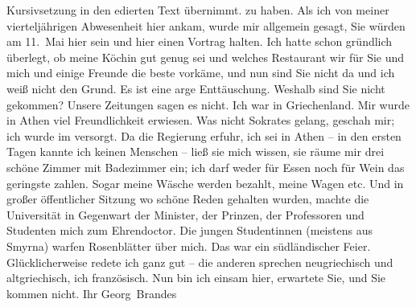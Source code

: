 \begin{ledgroupsized}[t]{13cm}
{{{{                  Kursivsetzung in den edierten Text übernimmt.}}}\label{K_L02383_1h}} zu haben.\pend
           \pstart
           Als ich von meiner vierteljährigen Abwesenheit hier ankam, wurde mir allgemein
               gesagt, Sie würden am 11. Mai hier sein und hier einen Vortrag halten.
               Ich hatte schon gründlich überlegt, ob meine Köchin gut genug sei und welches Restaurant wir für Sie und
               mich und einige Freunde die beste vorkäme, und nun sind Sie nicht da und ich weiß
               nicht den Grund. Es ist eine arge Enttäuschung. Weshalb sind Sie nicht gekommen?
               Unsere Zeitungen sagen es nicht.\pend
           \pstart
           Ich war in Griechenland. Mir wurde in Athen viel Freundlichkeit erwiesen. Was nicht Sokrates gelang, geschah mir; ich wurde im \label{K_L02383_2v}\label{K_L02383_2h} versorgt. Da die Regierung erfuhr,
               ich sei in Athen – in den ersten Tagen kannte ich
               keinen Menschen – ließ sie mich wissen, sie räume mir drei schöne Zimmer mit
               Badezimmer ein; ich darf weder für Essen noch für Wein das geringste zahlen. Sogar
               meine Wäsche werden bezahlt, meine Wagen etc. Und in großer öffentlicher Sitzung wo
               schöne Reden gehalten wurden, machte die Universität in Gegenwart der Minister, der Prinzen, der Professoren und
               Studenten mich zum Ehrendoctor. Die jungen Studentinnen (meistens aus Smyrna) warfen Rosenblätter über mich. Das war ein
               südländischer Feier. Glücklicherweise redete ich ganz gut – die anderen
               sprechen neugriechisch und altgriechisch, ich französisch.\pend
           \pstart
           Nun bin ich einsam hier, erwartete Sie, und Sie kommen nicht.\pend
           \pstart Ihr \spacefill\mbox{Georg Brandes}\pend{}
         
         \endnumbering{}\end{ledgroupsized}  \newcommand{\dateiname}{L02383}\newcommand{\titel}{Georg Brandes an Arthur Schnitzler, 15. 5. 1922}\newcommand{\editorInnen}{Martin Anton Müller und Gerd-Hermann Susen}
      
